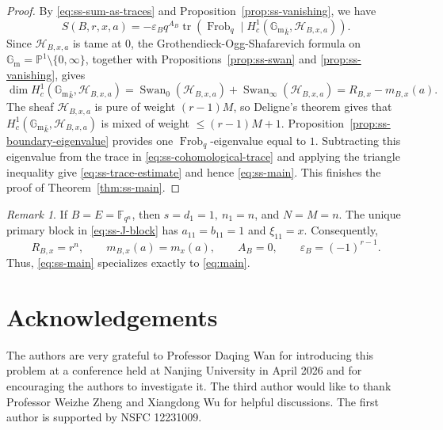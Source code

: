 \documentclass[11pt]{amsart}
\theoremstyle{remark}
\newtheorem{remark}[theorem]{Remark}
\newcommand{\F}{\mathbb F}
\newcommand{\Gm}{\mathbb G_{\mathrm m}}
\newcommand{\Pj}{\mathbb P}
\newcommand{\Frob}{\operatorname{Frob}}
\newcommand{\Swan}{\operatorname{Swan}}
\newcommand{\cH}{\mathcal H}
\begin{document}
\begin{proof}
By \eqref{eq:ss-sum-as-traces} and Proposition~\ref{prop:ss-vanishing}, we have
\begin{equation}\label{eq:ss-cohomological-trace}
S(B,r,x,a)=-\varepsilon_Bq^{A_B}
\operatorname{tr}\left(\Frob_q\mid H_c^1({\Gm}_{\bar{k}},\cH_{B,x,a})\right).
\end{equation}
Since $\cH_{B,x,a}$ is tame at $0$, the
Grothendieck-Ogg-Shafarevich formula on
$\Gm=\Pj^1\setminus\{0,\infty\}$, together with
Propositions~\ref{prop:ss-swan} and \ref{prop:ss-vanishing}, gives
\begin{equation}\label{eq:ss-H1-dimension}
\dim H_c^1({\Gm}_{\bar{k}},\cH_{B,x,a})=\Swan_0(\cH_{B,x,a})+\Swan_\infty(\cH_{B,x,a})=R_{B,x}-m_{B,x}(a).
\end{equation}
The sheaf $\cH_{B,x,a}$ is pure of weight $(r-1)M$, so Deligne's theorem gives that $H_c^1({\Gm}_{\bar{k}},\cH_{B,x,a})$ is mixed of weight $\le (r-1)M+1$. Proposition~\ref{prop:ss-boundary-eigenvalue} provides
one $\Frob_q$-eigenvalue equal to $1$. Subtracting this eigenvalue from the trace in
\eqref{eq:ss-cohomological-trace} and applying the triangle inequality give
\eqref{eq:ss-trace-estimate} and hence \eqref{eq:ss-main}. This finishes the proof of Theorem~\ref{thm:ss-main}.
\end{proof}

\begin{remark}\label{rem:ss-field-specialization}
If $B=E=\F_{q^n}$, then $s=d_1=1,~n_1=n$, and $N=M=n$. The unique primary block in \eqref{eq:ss-J-block} has $a_{11}=b_{11}=1$ and $\xi_{11}=x$. Consequently,
\[
R_{B,x}=r^n,\qquad m_{B,x}(a)=m_x(a),\qquad
A_B=0,\qquad \varepsilon_B=(-1)^{r-1}.
\]
Thus, \eqref{eq:ss-main} specializes exactly to \eqref{eq:main}.
\end{remark}

\section*{Acknowledgements}

The authors are very grateful to Professor Daqing Wan for introducing this problem at a conference held at Nanjing University in April 2026 and for encouraging the authors to investigate it. The third author would like to thank Professor Weizhe Zheng and Xiangdong Wu for helpful discussions. The first author is supported by NSFC 12231009.
\end{document}
